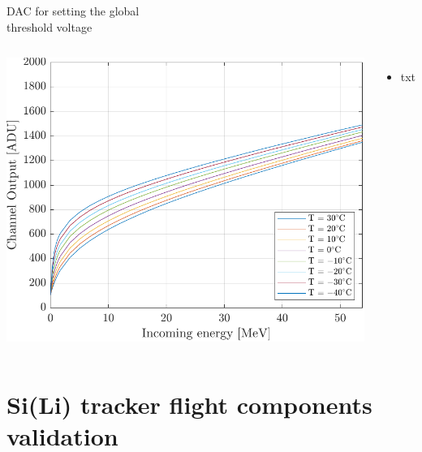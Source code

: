 \documentclass[aspectratio=169,xcolor=dvipsnames]{beamer}
\begin{document}
\begin{frame}{DAC for setting the global\\ \vskip-0.15cm threshold voltage}
\begin{columns}[T]
            \vskip-0.4cm
            \begin{center}
                \includegraphics[height=0.48\textheight]{images/temperature_effects/fdt_csavrefgm_530mV_tau6_keV.pdf}
            \end{center}
    
            \vskip-0.2cm
            \begin{itemize}
                \item txt
            \end{itemize}
    
    \end{columns}
\end{frame}



\section{Si(Li) tracker flight components validation}
\end{document}
